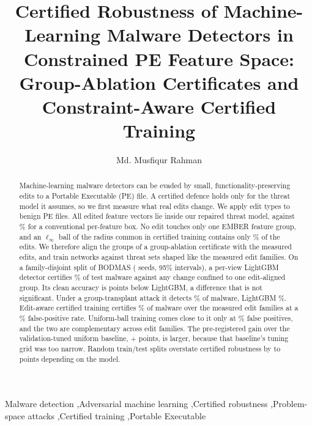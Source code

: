\documentclass[preprint,12pt,authoryear]{elsarticle}
\begin{document}
\begin{frontmatter}
\title{Certified Robustness of Machine-Learning Malware Detectors in Constrained {PE} Feature Space: Group-Ablation Certificates and Constraint-Aware Certified Training}

\author[inst1]{Md. Musfiqur Rahman}

\begin{abstract}
Machine-learning malware detectors can be evaded by small, functionality-preserving edits to a Portable Executable (PE) file. A certified defence holds only for the threat model it assumes, so we first measure what real edits change. We apply \PsNEditTypesInScope{} edit types to \PsNFiles{} benign PE files. All \PsNEditedInScope{} edited feature vectors lie inside our repaired threat model, against \PsDraftBoxInsidePct\% for a conventional per-feature box. No edit touches only one EMBER feature group, and an $\ell_\infty$ ball of the radius common in certified training contains only \PsEpsLeTrainPct\% of the edits. We therefore align the groups of a group-ablation certificate with the measured edits, and train networks against threat sets shaped like the measured edit families. On a family-disjoint split of BODMAS (\NSeedsFam{} seeds, 95\% intervals), a per-view LightGBM detector certifies \FamCertROneLgbmViews\% of test malware against any change confined to one edit-aligned group. Its clean accuracy is \CmpFAbs{} points below LightGBM, a difference that is not significant. Under a group-transplant attack it detects \FamGattackLgbmViews\% of malware, LightGBM \FamGattackLgbm\%. Edit-aware certified training certifies \SwEditCert\% of malware over the measured edit families at a \SwEditFpr\% false-positive rate. Uniform-ball training comes close to it only at \SwUnifOneFpr\% false positives, and the two are complementary across edit families. The pre-registered gain over the validation-tuned uniform baseline, +\CmpADiff{} points, is larger, because that baseline's tuning grid was too narrow. Random train/test splits overstate certified robustness by \RandFamGapMin{} to \RandFamGapMax{} points depending on the model.
\end{abstract}

\begin{keyword}
Malware detection \sep Adversarial machine learning \sep Certified robustness \sep Problem-space attacks \sep Certified training \sep Portable Executable
\end{keyword}
\end{frontmatter}
\end{document}
